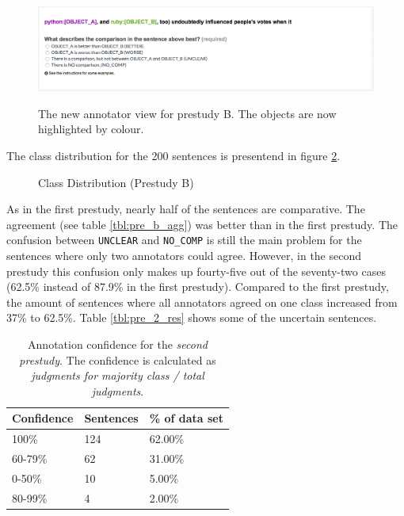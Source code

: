 \begin{figure}[h]
\centering
\includegraphics[width=1\textwidth]{images/prestudy/2_question}
\label{img:2_question}
\caption{The new annotator view for prestudy B. The objects are now highlighted by colour.}
\end{figure}

The class distribution for the 200 sentences is presentend in figure \ref{fig:dist_pre_b}. 


\begin{figure}[h]
\centering
\caption{Class Distribution (Prestudy B)}
\label{fig:dist_pre_b}
\end{figure}

As in the first prestudy, nearly half of the sentences are comparative. The agreement (see table \ref{tbl:pre_b_agg}) was better than in the first prestudy. The confusion between \texttt{UNCLEAR} and \texttt{NO\_COMP} is still the main problem for the sentences where only two annotators could agree. However, in the second prestudy this confusion only makes up fourty-five out of the seventy-two cases (62.5\% instead of 87.9\% in the first prestudy). Compared to the first prestudy, the amount of sentences where all annotators agreed on one class increased from 37\% to 62.5\%. Table \ref{tbl:pre_2_res} shows some of the uncertain sentences.

\begin{table}[h]
\caption{Annotation confidence for the \emph{second prestudy}. The confidence is calculated as \emph{judgments for majority class / total judgments}.}
\label{fig:pre_b_agg}
\begin{tabularx}{\textwidth}{XXX}
\toprule
Confidence & Sentences & \% of data set \\
\midrule
100\%	&	124	&	62.00\%	 \\ 
60-79\%	&	62	&	31.00\%	 \\ 
0-50\%	&	10	&	5.00\%	 \\ 
80-99\%	&	4	&	2.00\%	 \\ 
\bottomrule
\end{tabularx}
\end{table}



